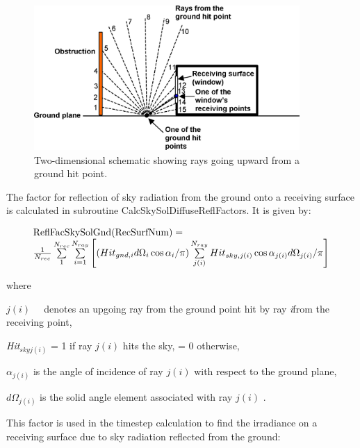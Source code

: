 \begin{figure}[hbtp] %
\centering
\includegraphics[width=0.9\textwidth, height=0.9\textheight, keepaspectratio=true]{media/image685.png}
\caption{Two-dimensional schematic showing rays going upward from a ground hit point. \protect \label{fig:two-dimensional-schematic-showing-rays-going-001}}
\end{figure}

The factor for reflection of sky radiation from the ground onto a receiving surface is calculated in subroutine CalcSkySolDiffuseReflFactors. It is given by:

\begin{equation}
\begin{array}{l}
{\rm{ReflFacSkySolGnd(RecSurfNum)}} = \\\frac{1}{{{N_{rec}}}}\sum\limits_1^{{N_{rec}}} {\sum\limits_{i = 1}^{{N_{ray}}} {\left[ {(Hi{t_{gnd,i}}d{\Omega_i}\cos {\alpha_i}/\pi )\sum\limits_{j(i)}^{{N_{ray}}} {Hi{t_{sky,j(i)}}\cos {\alpha_{j(i)}}d{\Omega_{j(i)}}/\pi } } \right]} }
\end{array}
\end{equation}

where

\emph{\(j(i)\) ~}~denotes an upgoing ray from the ground point hit by ray \emph{i}from the receiving point,

\emph{Hit\(_{skyj(i)}\)} = 1 if ray \emph{\(j(i)\)} hits the sky, = 0 otherwise,

\({\alpha_{j(i)}}\) is the angle of incidence of ray \(j(i)\) with respect to the ground plane,

\(d{\Omega_{j(i)}}\) is the solid angle element associated with ray \(j(i)\) .

This factor is used in the timestep calculation to find the irradiance on a receiving surface due to sky radiation reflected from the ground:

